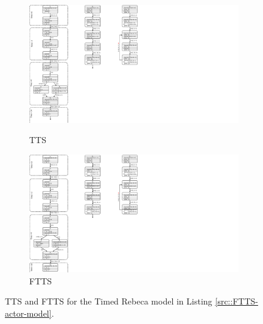 \begin{figure}
\centering
\begin{subfigure}[b]{0.34\textwidth}
  \centering
  \small{
   \includegraphics[width=.8\textwidth]{resources/TTS.pdf}
  }
  \caption{TTS\label{fig::TTS}}
\end{subfigure}
\begin{subfigure}[b]{0.14\textwidth}
  \centering
  \small{
   \includegraphics[width=.8\textwidth]{resources/FTTS.pdf}
   \caption{FTTS}
   \label{fig::FTTS}
  }
\end{subfigure}
\caption{ TTS and FTTS for the Timed Rebeca model in Listing
\ref{src::FTTS-actor-model}.
}
\label{fig::FTTSandTTS}
\end{figure}

